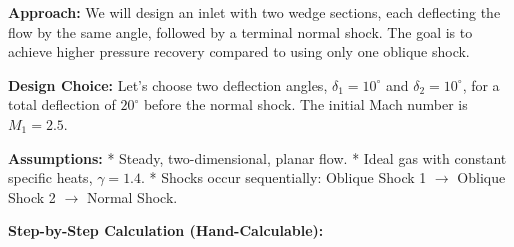 \textbf{Approach:} We will design an inlet with two wedge sections, each
deflecting the flow by the same angle, followed by a terminal normal
shock. The goal is to achieve higher pressure recovery compared to using
only one oblique shock.

\textbf{Design Choice:} Let's choose two deflection angles,
\(\delta_1 = 10^\circ\) and \(\delta_2 = 10^\circ\), for a total
deflection of \(20^\circ\) before the normal shock. The initial Mach
number is \(M_1 = 2.5\).

\textbf{Assumptions:} * Steady, two-dimensional, planar flow. * Ideal
gas with constant specific heats, \(\gamma = 1.4\). * Shocks occur
sequentially: Oblique Shock 1 \(\to\) Oblique Shock 2 \(\to\) Normal
Shock.

\textbf{Step-by-Step Calculation (Hand-Calculable):}

